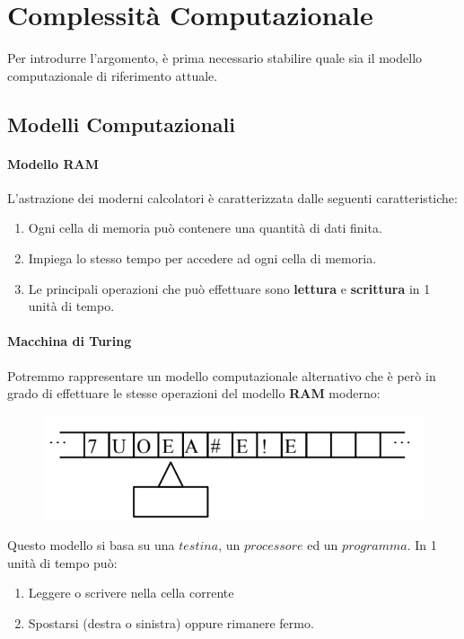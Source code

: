 \documentclass{article}
\begin{document}
\newpage

\section{Complessità Computazionale}

Per introdurre l'argomento, è prima necessario stabilire quale sia il modello computazionale di riferimento attuale.

\subsection{Modelli Computazionali}

\paragraph{Modello RAM} L'astrazione dei moderni calcolatori è caratterizzata dalle seguenti caratteristiche:

\begin{enumerate}
    \item Ogni cella di memoria può contenere una quantità di dati finita.
    \item Impiega lo stesso tempo per accedere ad ogni cella di memoria.
    \item Le principali operazioni che può effettuare sono \textbf{lettura} e \textbf{scrittura} in 1 unità di tempo.
\end{enumerate}

\paragraph{Macchina di Turing} Potremmo rappresentare un modello computazionale alternativo che è però in grado di effettuare le stesse operazioni del modello \textbf{RAM} moderno:

\begin{figure}[htbp]
    \center
    \includegraphics[scale=0.45]{img/macchinaTuring.png}
\end{figure}

Questo modello si basa su una $testina$, un $processore$ ed un $programma$. In 1 unità di tempo può:
\begin{enumerate}
    \item Leggere o scrivere nella cella corrente
    \item Spostarsi (destra o sinistra) oppure rimanere fermo.
\end{enumerate}
\end{document}
